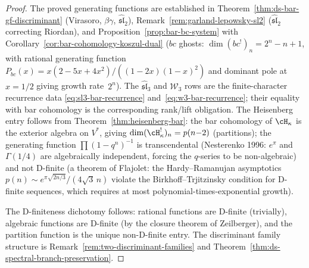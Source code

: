 \begin{proof}
The proved generating functions are established in
Theorem~\ref{thm:ds-bar-gf-discriminant}
(Virasoro, $\beta\gamma$, $\widehat{\mathfrak{sl}}_2$),
Remark~\ref{rem:garland-lepowsky-sl2}
($\widehat{\mathfrak{sl}}_2$ correcting Riordan),
and Proposition~\ref{prop:bar-bc-system}
with Corollary~\ref{cor:bar-cohomology-koszul-dual}
($bc$ ghosts: $\dim(bc^!)_n = 2^n - n + 1$, with rational
generating function
$P_{bc}(x) = x(2-5x+4x^2)/((1-2x)(1-x)^2)$ and dominant pole
at $x = 1/2$ giving growth rate~$2^n$).
The $\widehat{\mathfrak{sl}}_3$ and $\mathcal{W}_3$ rows are the
finite-character recurrence data
\eqref{eq:sl3-bar-recurrence} and~\eqref{eq:w3-bar-recurrence};
their equality with bar cohomology is the corresponding rank/lift
obligation.
The Heisenberg entry follows from
Theorem~\ref{thm:heisenberg-bar}: the bar cohomology of
$\cH_\kappa$ is the exterior algebra on $V^*$, giving
$\dim (\cH_\kappa^!)_n = p(n{-}2)$ (partitions);
the generating function $\prod(1-q^n)^{-1}$ is transcendental
(Nesterenko 1996: $e^{\pi}$ and $\Gamma(1/4)$ are
algebraically independent, forcing the $q$-series to be
non-algebraic) and not D-finite
(a theorem of Flajolet: the
Hardy--Ramanujan asymptotics $p(n) \sim
e^{\pi\sqrt{2n/3}}/(4\sqrt{3}\,n)$ violate the
Birkhoff--Trjitzinsky condition for D-finite sequences,
which requires at most polynomial-times-exponential growth).

The D-finiteness dichotomy follows:
rational functions are D-finite (trivially),
algebraic functions are D-finite
(by the closure theorem of Zeilberger),
and the partition function is the unique non-D-finite entry.
The discriminant family structure is
Remark~\ref{rem:two-discriminant-families} and
Theorem~\ref{thm:ds-spectral-branch-preservation}.
\end{proof}

